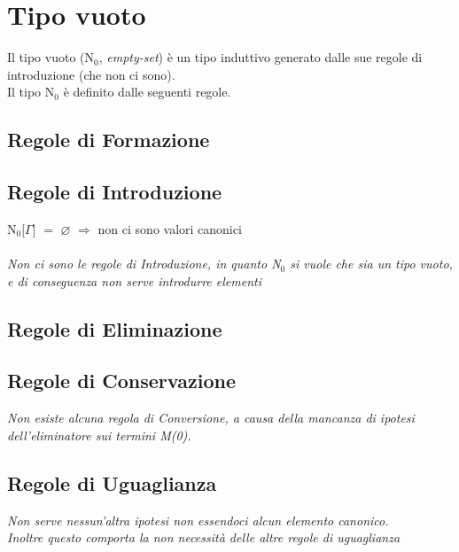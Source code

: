 \chapter{Tipo vuoto}
\label{cap: N0}
Il tipo vuoto (N$_0$, \textit{empty-set}) \`e un tipo induttivo generato dalle sue regole di introduzione (che non ci sono). \\ Il tipo N$_0$ \`e definito dalle seguenti regole.

\section{Regole di Formazione}
\label{sec: formazione-N0}
\begin{prooftree}
\end{prooftree}

\section{Regole di Introduzione}
\label{sec: introduzione-N0}
N$_0$[$\Gamma$] $=$ $\varnothing$ $\Rightarrow$ non ci sono valori canonici\\\\
\noindent
\textit{Non ci sono le regole di Introduzione, in quanto N$_0$ si vuole che sia un tipo vuoto, e di conseguenza non serve introdurre elementi}

\section{Regole di Eliminazione}
\label{sec: eliminazione-N0}
\begin{prooftree}
\end{prooftree}

\section{Regole di Conservazione}
\label{sec: conservazione-funzione}
\textit{Non esiste alcuna regola di Conversione, a causa della mancanza di ipotesi dell'eliminatore sui termini M(0).}

\section{Regole di Uguaglianza}
\label{sec: uguaglianza-funzione}
\begin{prooftree}
\end{prooftree}
\noindent
\textit{Non serve nessun'altra ipotesi non essendoci alcun elemento canonico.\\ Inoltre questo comporta la non necessit\`a delle altre regole di uguaglianza}


